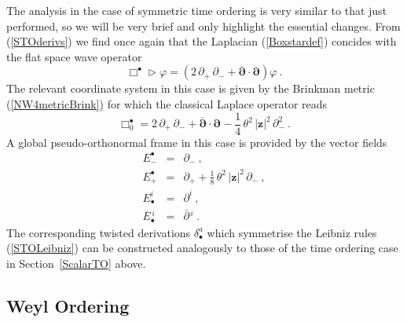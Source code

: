 \documentclass[11pt,a4paper]{article}
\def\nn{\nonumber}
\newcommand{\1}{\mathbb{1}}
\newcommand{\mbf}[1]{{\boldsymbol {#1} }}
\def\mz{{\mbf z}}
\def\mdell{{\mbf\partial}}
\def\nn{\nonumber}
\begin{document}
The analysis in the case of symmetric time ordering is very similar to
that just performed, so we will be very brief and only highlight the
essential changes. From (\ref{STOderivs}) we find once again that the
Laplacian (\ref{Boxstardef}) concides with the flat space wave
operator
\begin{equation}
\Box^\bullet\triangleright\varphi=\left(2\,\partial_+\,\partial_-+
\overline{\mdell}\cdot\mdell\right)\varphi \ .
\label{STOBoxeq}\end{equation}
The relevant coordinate system in this case is given by the Brinkman
metric (\ref{NW4metricBrink}) for which the classical Laplace
operator reads
\begin{equation}
\Box_0^\bullet=2\,\partial_+\,\partial_-+\overline{\mdell}\cdot
\mdell-\mbox{$\frac14$}\,\theta^2\,|\mz|^2\,\partial_-^2 \ .
\label{STOBox0}\end{equation}
A global pseudo-orthonormal frame in this case is provided by the
vector fields
\begin{eqnarray}
E_-^\bullet&=&\partial_- \ , \nn\\ E_+^\bullet&=&\partial_++
\mbox{$\frac18$}\,\theta^2\,|\mz|^2\,\partial_- \ ,
\nn\\ E^{i}_\bullet&=&\partial^i \ , \nn\\
\overline{E}{}_{\bullet}^{\,i}&=&\overline{\partial}{}^{\,i} \ .
\label{STOorthoframe}\end{eqnarray}
The corresponding twisted derivations $\delta^a_\bullet$ which
symmetrise the Leibniz rules (\ref{STOLeibniz}) can be constructed
analogously to those of the time ordering case in
Section~\ref{ScalarTO} above.

\subsection{Weyl Ordering\label{ScalarWeyl}}
\end{document}

